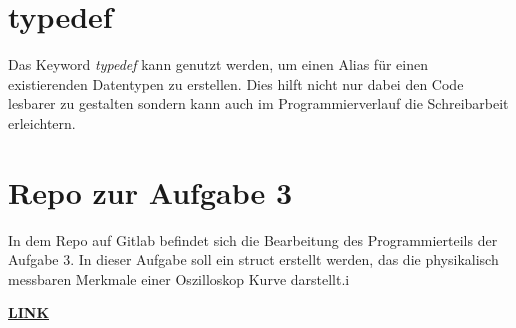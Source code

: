 \section{typedef}
Das Keyword \textit{typedef} kann genutzt werden, um einen Alias für einen existierenden Datentypen zu erstellen.
Dies hilft nicht nur dabei den Code lesbarer zu gestalten sondern kann auch im Programmierverlauf die Schreibarbeit erleichtern.

\section{Repo zur Aufgabe 3}
In dem Repo auf Gitlab befindet sich die Bearbeitung des Programmierteils der Aufgabe 3. 
In dieser Aufgabe soll ein struct erstellt werden, das die physikalisch messbaren Merkmale einer Oszilloskop Kurve darstellt.i\par
\href{https://gitlab.thga.de/daniel.krueger/pruefung_sose_2023_aufgabe_3_struct}{\textbf{LINK}} 
